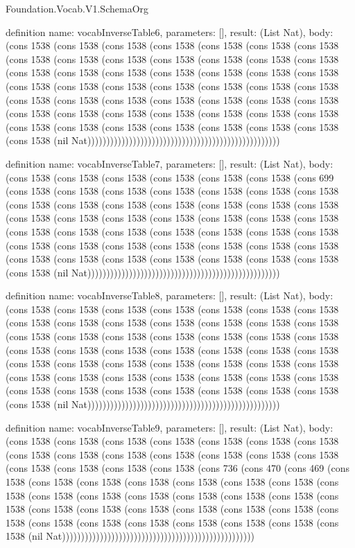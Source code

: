 \begin{lexlean}{Foundation.Vocab.V1.SchemaOrg}
\begin{semanticmodule}
definition{
  name: vocabInverseTable6,
  parameters: [],
  result: (List Nat),
  body: (cons 1538 (cons 1538 (cons 1538 (cons 1538 (cons 1538 (cons 1538 (cons 1538 (cons 1538 (cons 1538 (cons 1538 (cons 1538 (cons 1538 (cons 1538 (cons 1538 (cons 1538 (cons 1538 (cons 1538 (cons 1538 (cons 1538 (cons 1538 (cons 1538 (cons 1538 (cons 1538 (cons 1538 (cons 1538 (cons 1538 (cons 1538 (cons 1538 (cons 1538 (cons 1538 (cons 1538 (cons 1538 (cons 1538 (cons 1538 (cons 1538 (cons 1538 (cons 1538 (cons 1538 (cons 1538 (cons 1538 (cons 1538 (cons 1538 (cons 1538 (cons 1538 (cons 1538 (cons 1538 (cons 1538 (cons 1538 (cons 1538 (cons 1538 (nil Nat)))))))))))))))))))))))))))))))))))))))))))))))))))
}

definition{
  name: vocabInverseTable7,
  parameters: [],
  result: (List Nat),
  body: (cons 1538 (cons 1538 (cons 1538 (cons 1538 (cons 1538 (cons 1538 (cons 699 (cons 1538 (cons 1538 (cons 1538 (cons 1538 (cons 1538 (cons 1538 (cons 1538 (cons 1538 (cons 1538 (cons 1538 (cons 1538 (cons 1538 (cons 1538 (cons 1538 (cons 1538 (cons 1538 (cons 1538 (cons 1538 (cons 1538 (cons 1538 (cons 1538 (cons 1538 (cons 1538 (cons 1538 (cons 1538 (cons 1538 (cons 1538 (cons 1538 (cons 1538 (cons 1538 (cons 1538 (cons 1538 (cons 1538 (cons 1538 (cons 1538 (cons 1538 (cons 1538 (cons 1538 (cons 1538 (cons 1538 (cons 1538 (cons 1538 (cons 1538 (nil Nat)))))))))))))))))))))))))))))))))))))))))))))))))))
}

definition{
  name: vocabInverseTable8,
  parameters: [],
  result: (List Nat),
  body: (cons 1538 (cons 1538 (cons 1538 (cons 1538 (cons 1538 (cons 1538 (cons 1538 (cons 1538 (cons 1538 (cons 1538 (cons 1538 (cons 1538 (cons 1538 (cons 1538 (cons 1538 (cons 1538 (cons 1538 (cons 1538 (cons 1538 (cons 1538 (cons 1538 (cons 1538 (cons 1538 (cons 1538 (cons 1538 (cons 1538 (cons 1538 (cons 1538 (cons 1538 (cons 1538 (cons 1538 (cons 1538 (cons 1538 (cons 1538 (cons 1538 (cons 1538 (cons 1538 (cons 1538 (cons 1538 (cons 1538 (cons 1538 (cons 1538 (cons 1538 (cons 1538 (cons 1538 (cons 1538 (cons 1538 (cons 1538 (cons 1538 (cons 1538 (nil Nat)))))))))))))))))))))))))))))))))))))))))))))))))))
}

definition{
  name: vocabInverseTable9,
  parameters: [],
  result: (List Nat),
  body: (cons 1538 (cons 1538 (cons 1538 (cons 1538 (cons 1538 (cons 1538 (cons 1538 (cons 1538 (cons 1538 (cons 1538 (cons 1538 (cons 1538 (cons 1538 (cons 1538 (cons 1538 (cons 1538 (cons 1538 (cons 1538 (cons 736 (cons 470 (cons 469 (cons 1538 (cons 1538 (cons 1538 (cons 1538 (cons 1538 (cons 1538 (cons 1538 (cons 1538 (cons 1538 (cons 1538 (cons 1538 (cons 1538 (cons 1538 (cons 1538 (cons 1538 (cons 1538 (cons 1538 (cons 1538 (cons 1538 (cons 1538 (cons 1538 (cons 1538 (cons 1538 (cons 1538 (cons 1538 (cons 1538 (cons 1538 (cons 1538 (cons 1538 (nil Nat)))))))))))))))))))))))))))))))))))))))))))))))))))
}


\end{semanticmodule}
\end{lexlean}
